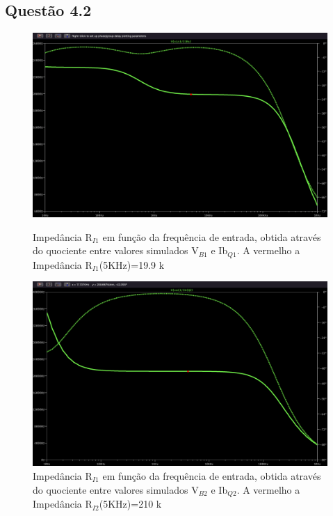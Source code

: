 \documentclass[a4paper,12pt]{article}
\begin{document}
				

			\subsection{Questão 4.2}
				\begin{figure}[H]
    					\centering
					\captionsetup{justification=centering}
    					\begin{minipage}[t]{0.45\textwidth}
        					\centering
					        					\includegraphics[width=1.2\textwidth]{4.2-1.png} %
        					\caption{Impedância R$_{I1}$ em função da frequência de entrada, obtida através do quociente entre valores simulados V$_{B1}$ e Ib$_{Q1}$. A vermelho a Impedância R$_{I1}$(5KHz)=19.9 k\Omega}
    					\end{minipage}\hfill
    					\begin{minipage}[t]{0.45\textwidth}
        					\centering
						
        					\includegraphics[width=1.2\textwidth]{4.2-2.png} %
        					\caption{Impedância R$_{I1}$ em função da frequência de entrada, obtida através do quociente entre valores simulados V$_{B2}$ e Ib$_{Q2}$. A vermelho a Impedância R$_{I2}$(5KHz)=210 k\Omega}
    						\end{minipage}
				\end{figure}
\end{document}
